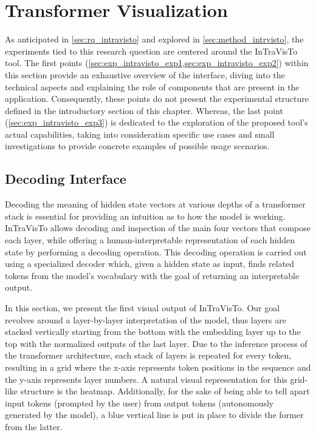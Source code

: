 \section{Transformer Visualization}\label{sec:exp_intravisto}

As anticipated in \cref{sec:rq_intravisto} and explored in \cref{sec:method_intrvisto}, the experiments tied to this research question are centered around the InTraVisTo tool.
The first points (\cref{sec:exp_intravisto_exp1,sec:exp_intravisto_exp2}) within this section provide an exhaustive overview of the interface, diving into the technical aspects and explaining the role of components that are present in the application.
Consequently, these points do not present the experimental structure defined in the introductory section of this chapter.
Whereas, the last point (\cref{sec:exp_intravisto_exp3}) is dedicated to the exploration of the proposed tool's actual capabilities, taking into consideration specific use cases and small investigations to provide concrete examples of possible usage scenarios.

\subsection{Decoding Interface}\label{sec:exp_intravisto_exp1}

Decoding the meaning of hidden state vectors at various depths of a transformer stack is essential for providing an intuition as to how the model is working.
InTraVisTo allows decoding and inspection of the main four vectors that compose each layer, while offering a human-interpretable representation of each hidden state by performing a decoding operation.
This decoding operation is carried out using a specialized decoder which, given a hidden state as input, finds related tokens from the model's vocabulary with the goal of returning an interpretable output.

In this section, we present the first visual output of InTraVisTo.
Our goal revolves around a layer-by-layer interpretation of the model, thus layers are stacked vertically starting from the bottom with the embedding layer up to the top with the normalized outputs of the last layer.
Due to the inference process of the transformer architecture, each stack of layers is repeated for every token, resulting in a grid where the x-axis represents token positions in the sequence and the y-axis represents layer numbers.
A natural visual representation for this grid-like structure is the heatmap.
Additionally, for the sake of being able to tell apart input tokens (prompted by the user) from output tokens (autonomously generated by the model), a blue vertical line is put in place to divide the former from the latter.


